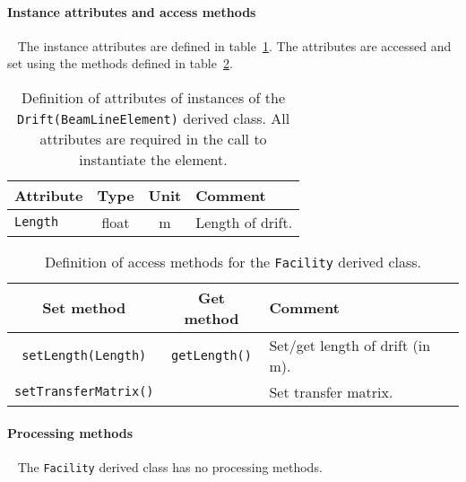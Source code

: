 \paragraph{Instance attributes and access methods} ~\newline
\label{SubSubSect:Drft:InstAttr}
\noindent
The instance attributes are defined in
table~\ref{Tab:Drft:Attributes}. 
The attributes are accessed and set using the methods defined in
table~\ref{Tab:Drft:Methods}.
\begin{table}[h]
  \caption{
    Definition of attributes of instances of
    the \texttt{Drift(BeamLineElement)} derived class.
    All attributes are required in the call to instantiate the
    element.
  }
  \label{Tab:Drft:Attributes}
  \begin{center}
    \begin{tabular}{|l|c|c|p{10cm}|}
      \hline
      \textbf{Attribute} & \textbf{Type} & \textbf{Unit} & \textbf{Comment}                                                                   \\
      \hline
      \texttt{Length} & float & m & Length of drift. \\
      \hline
    \end{tabular}
  \end{center}
\end{table}
\begin{table}[h]
  \caption{
    Definition of access methods for the \texttt{Facility} derived
    class. 
  }
  \label{Tab:Drft:Methods}
  \begin{center}
    \begin{tabular}{|c|c|p{7cm}|}
      \hline
      \textbf{Set method} & \textbf{Get method}  & \textbf{Comment}                       \\
      \hline
      \texttt{setLength(Length)}   & \texttt{getLength()} & Set/get length of drift (in m). \\
      \texttt{setTransferMatrix()} &                      & Set transfer matrix.            \\
      \hline
    \end{tabular}
  \end{center}
\end{table}

\paragraph{Processing methods} ~\newline
\noindent
The \texttt{Facility} derived class has no processing methods.


